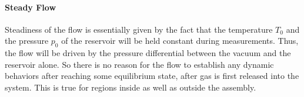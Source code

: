 \paragraph{Steady Flow}

	Steadiness of the flow is essentially given by the fact that the temperature $T_0$ and the pressure $p_0$ of the reservoir will be held constant during measurements.
	Thus, the flow will be driven by the pressure differential between the vacuum and the reservoir alone.
	So there is no reason for the flow to establish any dynamic behaviors after reaching some equilibrium state, after gas is first released into the system.
	This is true for regions inside as well as outside the assembly.

